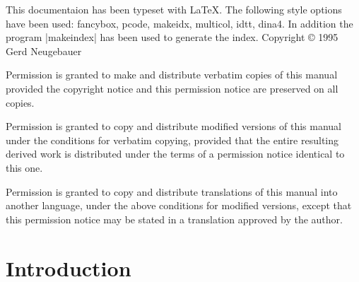 \maketitle

\small
This documentaion has been typeset with \LaTeX. The following style options
have been used: fancybox, pcode, makeidx, multicol, idtt, dina4. In addition
the program |makeindex| has been used to generate the index.
\normalsize\vfill
Copyright {\copyright} 1995 Gerd Neugebauer
\medskip

Permission is granted to make and distribute verbatim copies of this manual
provided the copyright notice and this permission notice are preserved on all
copies.


Permission is granted to copy and distribute modified versions of this manual
under the conditions for verbatim copying, provided that the entire resulting
derived work is distributed under the terms of a permission notice identical
to this one.

Permission is granted to copy and distribute translations of this manual into
another language, under the above conditions for modified versions, except
that this permission notice may be stated in a translation approved by the
author.

\newpage %
\WithUnderscore{\tableofcontents}
\newpage %

\chapter*{Introduction}

